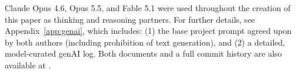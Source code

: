 Claude Opus 4.6, Opus 5.5, and Fable 5.1 were used throughout the creation of this paper as thinking and reasoning partners. For further details, see Appendix~\ref{app:genai}, which includes: (1) the base project prompt agreed upon by both authors (including prohibition of text generation), and (2) a detailed, model-curated genAI log. Both documents and a full commit history are also available at .